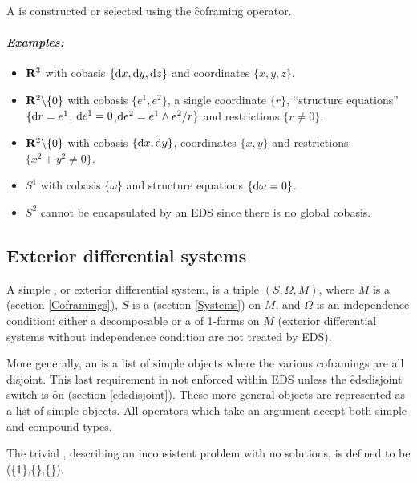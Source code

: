 A  is constructed or selected using the \f{coframing}
operator. 

\paragraph{\it Examples:}
\begin{itemize}
\item $\mathbf{R}^3$ with cobasis $\{\mathrm{d} x,\mathrm{d} y,\mathrm{d} z\}$ and coordinates $\{x,y,z\}$.
\item $\mathbf{R}^2\backslash\{0\}$ with cobasis $\{e^1,e^2\}$, a single
	coordinate $\{r\}$, ``structure equations'' $\{\mathrm{d} r = e^1$,
	$\mathrm{d} e^1=0$,$\mathrm{d} e^2=e^1\wedge e^2/r\}$ and restrictions $\{r\neq0\}$.
\item $\mathbf{R}^2\backslash\{0\}$ with cobasis $\{\mathrm{d} x,\mathrm{d} y\}$,
	coordinates $\{x,y\}$ and restrictions $\{x^2+y^2\neq0\}$.
\item $S^1$ with cobasis $\{\omega\}$ and structure equations 
	$\{\mathrm{d}\omega = 0\}$.
\item $S^2$ cannot be encapsulated by an EDS  since there
        is no global cobasis.
\end{itemize}

\subsection{Exterior differential systems}
\label{Exterior differential systems}

A simple , or exterior differential system, is a triple
$(S,\Omega,M)$, where $M$ is a  (section
\ref{Coframings}), $S$ is a  (section \ref{Systems}) on
$M$, and $\Omega$ is an independence condition: either a decomposable
 or a  of 1-forms on $M$ (exterior
differential systems without independence condition are not treated by
EDS). 

More generally, an  is a list of simple  objects
where the various coframings are all disjoint. This last requirement in
not enforced within EDS unless the \f{edsdisjoint} switch is \f{on}
(section \ref{edsdisjoint}). These more general  objects are
represented as a list of simple  objects. All operators which
take an  argument accept both simple and compound types. 

The trivial , describing an inconsistent problem with no
solutions, is defined to be (\{1\},\{\},\{\}). 

